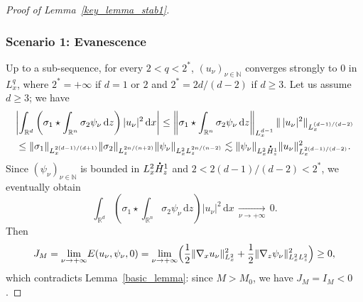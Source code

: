\documentclass[JEP,XML,SOM,NoEqCountersInSection,NoFloatCountersInSection,Unicode,published]{cedram}
\theoremstyle{definition}
\newcommand*{\overbigdot}[1]{%
\accentset{\mbox{\large\bfseries .}}{#1}}
\newenvironment{ProofOf}[1]{\begin{proof}[Proof of #1]}{\end{proof}}
\newcommand{\R}{\mathbb{R}}
\newcommand{\ud}{\, {\mathrm{d}}}
\begin{document}
\begin{ProofOf}{Lemma~\ref{key_lemma_stab1}}
\subsubsection*{Scenario 1: Evanescence} Up to a sub-sequence, for every $2<q<2^{*}$, $(u_{\nu})_{\nu\in\mathbb N}$ converges strongly to $0$ in $L_{x}^{q}$,
where $2^{*}=+\infty$ if $d=1$ or $2$ and $2^{*}=2d/(d-2)$ if $d\geq 3$. Let us assume $d\geq 3$; we have\vspace*{-3pt}
\begin{multline*}
\left|\int_{\R^{d}}\left(\sigma_{1}\star\int_{\R^{n}}\sigma_{2}\psi_{\nu}\ud z\right)|u_{\nu}|^{2}\ud x\right|\leq\left\|\sigma_{1}\star\int_{\R^{n}}\sigma_{2}\psi_{\nu}\ud z\right\|_{L_{x}^{d-1}}\|\,|u_{\nu}|^{2}\|_{L_{x}^{(d-1)/(d-2)}}\\
\leq\|\sigma_{1}\|_{L_{x}^{2(d-1)/(d+1)}}\|\sigma_{2}\|_{L_{z}^{2n/(n+2)}}\|\psi_{\nu}\|_{L_{x}^{2}L_{z}^{2n/(n-2)}}\lesssim\|\psi_{\nu}\|_{L_{x}^{2}\overbigdot{H}_{z}^{1}}\|u_{\nu}\|_{L_{x}^{2(d-1)/(d-2)}}^{2}.
\end{multline*}
Since $(\psi_{\nu})_{\nu\in\mathbb N}$ is bounded in $L_{x}^{2}\overbigdot{H}_{z}^{1}$ and $2<2(d-1)/(d-2)<2^{*}$, we even\-tual\-ly obtain\vspace*{-3pt}
\[
\int_{\R^{d}}\left(\sigma_{1}\star\int_{\R^{n}}\sigma_{2}\psi_{\nu}\ud z\right)|u_{\nu}|^{2}\ud x\,\underset{\nu\to +\infty}{\to}\,0.
\]
Then
\[
J_{M}=\underset{\nu\to+\infty}{\lim}E(u_{\nu},\psi_{\nu},0)=\underset{\nu\to+\infty}{\lim}\Bigl(\frac{1}{2}\|\nabla_{x}u_\nu\|_{L_{x}^{2}}^{2}+\frac{1}{2}\|\nabla_{z}\psi_{\nu}\|_{L_{x}^{2}L_{z}^{2}}^{2}\Bigr)\geq 0,
\]
which contradicts Lemma~\ref{basic_lemma}: since $M>M_0$, we have $J_{M}=I_M<0$.


\end{ProofOf}
\end{document}
